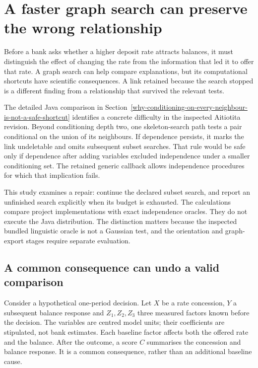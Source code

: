 \section{A faster graph search can preserve the wrong relationship}
\label{repair29:discovery}

Before a bank asks whether a higher deposit rate attracts balances, it must
distinguish the effect of changing the rate from the information that led it
to offer that rate. A graph search can help compare explanations, but its
computational shortcuts have scientific consequences. A link retained because
the search stopped is a different finding from a relationship that survived
the relevant tests.

The detailed Java comparison in Section~\ref{why-conditioning-on-every-neighbour-is-not-a-safe-shortcut} identifies a concrete difficulty in the
inspected Aitiotita revision. Beyond conditioning depth two, one skeleton-search
path tests a pair conditional on the union of its neighbours. If dependence
persists, it marks the link undeletable and omits subsequent subset searches.
That rule would be safe only if dependence after adding variables excluded
independence under a smaller conditioning set. The retained generic callback
allows independence procedures for which that implication fails.
\citep{repair29pc}

This study examines a repair: continue the declared subset search, and
report an unfinished search explicitly when its budget is exhausted. The
calculations compare project implementations with exact independence oracles.
They do not execute the Java distribution. The distinction matters because
the inspected bundled linguistic oracle is not a Gaussian test, and the
orientation and graph-export stages require separate evaluation.

\subsection{A common consequence can undo a valid comparison}

Consider a hypothetical one-period decision. Let $X$ be a rate concession,
$Y$ a subsequent balance response and $Z_1,Z_2,Z_3$ three measured factors
known before the decision. The variables are centred model units; their
coefficients are stipulated, not bank estimates. Each baseline factor affects
both the offered rate and the balance. After the outcome, a score $C$ summarises
the concession and balance response. It is a common consequence, rather than
an additional baseline cause.

